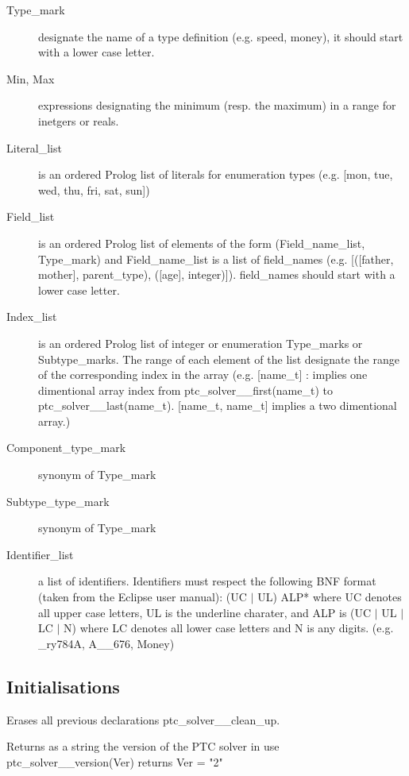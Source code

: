 \documentclass{article}
\begin{document}
\begin{description}
  \item [Type\_mark] designate the name of a type definition (e.g. speed,
  money), it should start with a lower case letter.
  \item [Min, Max] expressions designating the minimum (resp. the maximum) in a
range for inetgers or reals.
  \item [Literal\_list] is an ordered Prolog list of literals for enumeration
types (e.g. [mon, tue, wed, thu, fri, sat, sun])
  \item [Field\_list] is an ordered Prolog list of elements of the form
(Field\_name\_list, Type\_mark) and Field\_name\_list is a list of field\_names
(e.g. [([father, mother], parent\_type), ([age], integer)]). field\_names
should start with a lower case letter.
  \item [Index\_list] is an ordered Prolog list of integer or enumeration
Type\_marks or Subtype\_marks. The range of each element of the list designate
the range of the corresponding index in the array (e.g. [name\_t] : implies one
dimentional array index from ptc\_solver\_\_first(name\_t) to
ptc\_solver\_\_last(name\_t). [name\_t, name\_t] implies a two dimentional
array.)
  \item [Component\_type\_mark] synonym of Type\_mark
  \item [Subtype\_type\_mark] synonym of Type\_mark
  \item [Identifier\_list] a list of identifiers. Identifiers must respect the
following BNF format (taken from the Eclipse user manual): (UC $\mid$ UL) ALP*
where UC denotes all upper case letters, UL is the underline charater, and ALP
is (UC $\mid$ UL $\mid$ LC $\mid$ N) where LC denotes all lower case letters
and N is any digits. (e.g. \_ry784A, A\_\_676, Money)
\end{description}

\subsection{Initialisations}

\hspace{\parindent}
    {Erases all previous declarations}
    {ptc\_solver\_\_clean\_up.}
    {}

    {Returns as a string the version of the PTC solver in use}
    {ptc\_solver\_\_version(Ver) returns Ver = "2"}
    {}
\end{document}
